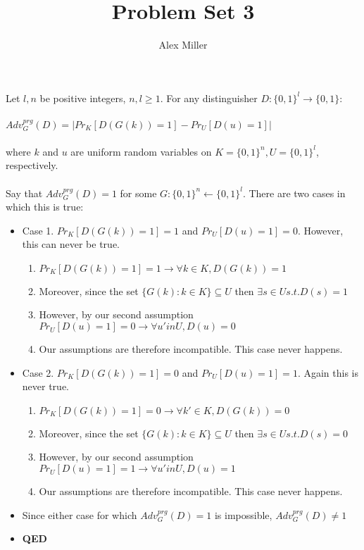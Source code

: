 \documentclass[]{article}
\title{Problem Set 3}
\author{Alex Miller}
\begin{document}
\maketitle

\section{}
Let $l,n$ be positive integers, $n, l \geq 1$. For any distinguisher $D: \{0,1\}^l \rightarrow \{0,1\}$: \\\\
$Adv^{prg}_G(D) = |Pr_K[D(G(k)) = 1] - Pr_U[D(u)=1]|$
\\\\
where $k$ and $u$ are uniform random variables on $K = \{0, 1\}^n, U = \{0,1\}^l$, respectively.
\\\\
Say that $Adv^{prg}_G(D) = 1$ for some $G: \{0,1\}^n \leftarrow \{0,1\}^l$. There are two cases in which this is true:
\begin{itemize}
	\item Case 1. $Pr_K[D(G(k)) = 1] = 1$ and $Pr_U[D(u) = 1] = 0$. However, this can never be true.
	\begin{enumerate}
		\item $Pr_K[D(G(k)) = 1] = 1 \rightarrow \forall k \in K, D(G(k)) = 1$
		\item Moreover, since the set $\{G(k): k \in K\} \subseteq U$ then $\exists s \in U s.t. D(s) = 1$
		\item However, by our second assumption $Pr_U[D(u) = 1] = 0 \rightarrow \forall u' in U, D(u) = 0$
		\item Our assumptions are therefore incompatible. This case never happens.
	\end{enumerate}
	\item Case 2. $Pr_K[D(G(k)) = 1] = 0$ and $Pr_U[D(u) = 1] = 1$. Again this is never true.
	\begin{enumerate}
		\item $Pr_K[D(G(k)) = 1] = 0 \rightarrow \forall k' \in K, D(G(k)) = 0$
		\item Moreover, since the set $\{G(k): k \in K\} \subseteq U$ then $\exists s \in U s.t. D(s) = 0$
		\item However, by our second assumption $Pr_U[D(u) = 1] = 1 \rightarrow \forall u' in U, D(u) = 1$
		\item Our assumptions are therefore incompatible. This case never happens.
	\end{enumerate}
	\item Since either case for which $Adv^{prg}_G(D) = 1$ is impossible, $Adv^{prg}_G(D) \neq 1$
	\item \textbf{QED}
\end{itemize}
\end{document}
